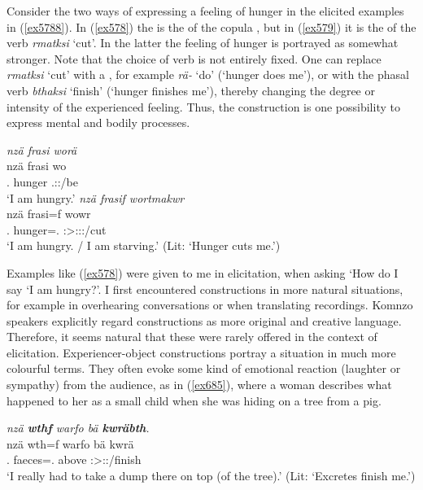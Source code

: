 Consider the two ways of expressing a feeling of hunger in the elicited examples in (\ref{ex5788}). In (\ref{ex578}) the  is the  of the copula , but in (\ref{ex579}) it is the  of the verb \emph{rmatksi} `cut'. In the latter the feeling of hunger is portrayed as somewhat stronger. Note that the choice of verb is not entirely fixed. One can replace \emph{rmatksi} `cut' with a , for example \emph{rä-} `do' (`hunger does me'), or with the phasal verb \emph{bthaksi} `finish' (`hunger finishes me'), thereby changing the degree or intensity of the experienced feeling. Thus, the  construction is one possibility to express mental and bodily processes.

\begin{exe}
	\ex
	\label{ex5788}
	\begin{xlist}
	\ex \emph{nzä frasi worä}\\
	\gll nzä frasi wo\\
	\Fsg.\Abs{} hunger \Fsg.\Sbj:\Nonpast:\Ipfv/be\\
	\trans `I am hungry.'
	\label{ex578}
	\ex \emph{nzä frasif wortmakwr}\\
	\gll nzä frasi=f wowr\\
	\Fsg.\Abs{} hunger=\Erg.\Sg{} \Stsg:\Sbj>\Fsg:\Obj:\Nonpast:\Ipfv/cut\\
	\trans `I am hungry. / I am starving.' (Lit: `Hunger cuts me.')
	\label{ex579}
	\end{xlist}
\end{exe}

Examples like (\ref{ex578}) were given to me in elicitation, when asking `How do I say `I am hungry?'. I first encountered  constructions in more natural situations, for example in overhearing conversations or when translating recordings. Komnzo speakers explicitly regard  constructions as more original and creative language. Therefore, it seems natural that these were rarely offered in the context of elicitation. Experiencer-object constructions portray a situation in much more colourful terms. They often evoke some kind of emotional reaction (laughter or sympathy) from the audience, as in (\ref{ex685}), where a woman describes what happened to her as a small child when she was hiding on a tree from a pig.

\begin{exe}
	\ex \emph{nzä \textbf{wthf} warfo bä \textbf{kwräbth}.}\\
	\gll nzä wth=f warfo bä kwrä\\
	\Fsg.\Abs{} faeces=\Erg.\Sg{} above \Med{} \Stsg:\Sbj>\Fsg:\Irr:\Pfv/finish\\
	\trans `I really had to take a dump there on top (of the tree).' (Lit: `Excretes finish me.')
	\label{ex685}
\end{exe}

